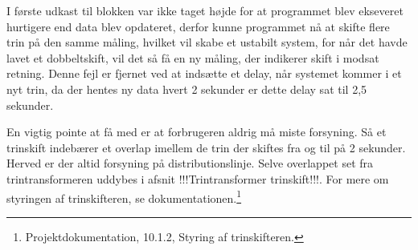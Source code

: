 I første udkast til blokken var ikke taget højde for at programmet blev ekseveret hurtigere end data blev opdateret, derfor kunne programmet nå at skifte flere trin på den samme måling, hvilket vil skabe et ustabilt system, for når det havde lavet et dobbeltskift, vil det så få en ny måling, der indikerer skift i modsat retning. Denne fejl er fjernet ved at indsætte et delay, når systemet kommer i et nyt trin, da der hentes ny data hvert 2 sekunder er dette delay sat til 2,5 sekunder.


En vigtig pointe at få med er at forbrugeren aldrig må miste forsyning. Så et trinskift indebærer et overlap imellem de trin der skiftes fra og til på 2 sekunder. Herved er der altid forsyning på distributionslinje. Selve overlappet set fra trintransformeren uddybes i afsnit !!!Trintransformer trinskift!!!.
For mere om styringen af trinskifteren, se dokumentationen.\footnote{Projektdokumentation, 10.1.2, Styring af trinskifteren.}
